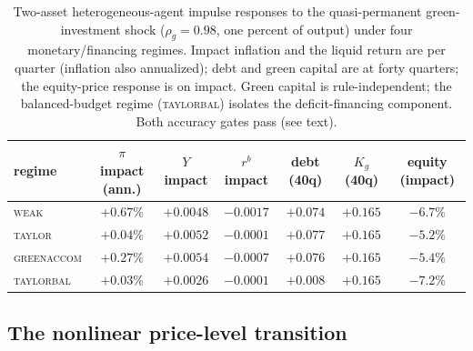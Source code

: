 \documentclass[12pt]{article}
\begin{document}
\begin{table}[!htb]
\centering
\caption{Two-asset heterogeneous-agent impulse responses to the
quasi-permanent green-investment shock ($\rho_g=0.98$, one percent of
output) under four monetary/financing regimes. Impact inflation and the
liquid return are per quarter (inflation also annualized); debt and green
capital are at forty quarters; the equity-price response is on impact.
Green capital is rule-independent; the balanced-budget regime
(\textsc{taylorbal}) isolates the deficit-financing component. Both accuracy
gates pass (see text).}
\label{tab:twoasset}
\footnotesize
\setlength{\tabcolsep}{4pt}
\begin{tabular}{lcccccc}
\toprule
regime & $\pi$ impact (ann.) & $Y$ impact & $r^b$ impact & debt (40q) & $K_g$ (40q) & equity (impact) \\
\midrule
\textsc{weak}       & $+0.67\%$ & $+0.0048$ & $-0.0017$ & $+0.074$ & $+0.165$ & $-6.7\%$ \\
\textsc{taylor}     & $+0.04\%$ & $+0.0052$ & $-0.0001$ & $+0.077$ & $+0.165$ & $-5.2\%$ \\
\textsc{greenaccom} & $+0.27\%$ & $+0.0054$ & $-0.0007$ & $+0.076$ & $+0.165$ & $-5.4\%$ \\
\textsc{taylorbal}  & $+0.03\%$ & $+0.0026$ & $-0.0001$ & $+0.008$ & $+0.165$ & $-7.2\%$ \\
\bottomrule
\end{tabular}
\end{table}


\subsection{The nonlinear price-level transition}\label{subsec:tier2}
\end{document}
